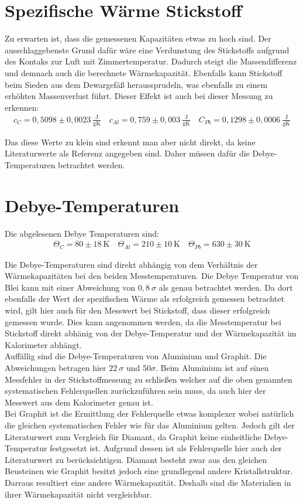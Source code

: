 \section{Spezifische Wärme Stickstoff}
Zu erwarten ist, dass die gemessenen Kapazitäten etwas zu hoch sind.
Der ausschlaggebenste Grund dafür wäre eine Verdunstung des Stickstoffs aufgrund des Kontaks zur Luft mit Zimmertemperatur.
Dadurch steigt die Massendifferenz und demnach auch die berechnete Wärmekapazität. Ebenfalls kann Stickstoff beim Sieden aus dem Dewargefäß heraussprudeln,
was ebenfalls zu einem erhöhten Massenverlust führt.
Dieser Effekt ist auch bei dieser Messung zu erkennen:
\begin{align}
    \boxed{c_C = 0,5098 \pm 0,0023 \ \tfrac{\text{J}}{\text{gK}} \quad c_{Al} = 0,759 \pm 0,003 \ \tfrac{\text{J}}{\text{gK}} \quad C_{Pb} = 0,1298 \pm 0,0006 \ \tfrac{\text{J}}{\text{gK}}}
\end{align}

Das diese Werte zu klein sind erkennt man aber nicht direkt, da keine Literaturwerte als Referenz angegeben sind.
Daher müssen dafür die Debye-Temperaturen betrachtet werden.

\section{Debye-Temperaturen}
Die abgelesenen Debye Temperaturen sind:
\begin{align}
    \boxed{\Theta_{C} = 80 \pm 18 \ \text{K} \quad \Theta_{Al} = 210 \pm 10 \ \text{K} \quad \Theta_{Pb} = 630 \pm 30 \ \text{K}}
\end{align}

Die Debye-Temperaturen sind direkt abhängig von dem Verhältnis der Wärmekapazitäten bei den beiden Messtemperaturen.
Die Debye Temperatur von Blei kann mit einer Abweichung von $0,8 \ \sigma$ als genau betrachtet werden. Da dort ebenfalls der Wert der spezifischen Wärme
als erfolgreich gemessen betrachtet wird, gilt hier auch für den Messwert bei Stickstoff, dass dieser erfolgreich gemessen wurde.
Dies kann angenommen werden, da die Messtemperatur bei Stickstoff direkt abhänig von der Debye-Temperatur und der Wärmekapazität im Kalorimeter abhängt.\\

Auffällig sind die Debye-Temperaturen von Aluminium und Graphit. Die Abweichungen betragen hier $22 \ \sigma$ und $50 \sigma$.
Beim Aluminium ist auf einen Messfehler in der Stickstoffmessung zu schließen welcher auf die oben genannten systematischen Fehlerquellen zurückzuführen sein muss, da auch hier der
Messwert aus dem Kalorimeter genau ist.\\
Bei Graphit ist die Ermittlung der Fehlerquelle etwas komplexer wobei natürlich die gleichen systematischen Fehler wie für das Aluminium gelten.
Jedoch gilt der Literaturwert zum Vergleich für Diamant, da Graphit keine einheitliche Debye-Temperatur festgesetzt ist.
Aufgrund dessen ist als Fehlerquelle hier auch der Literaturwert zu berücksichtigen. Diamant besteht zwar aus den gleichen Beusteinen wie Graphit besitzt jedoch eine grundlegend andere Kristallstruktur.
Darraus resultiert eine andere Wärmekapazität. Deshalb sind die Materialien in ihrer Wärmekapazität nicht vergleichbar.

